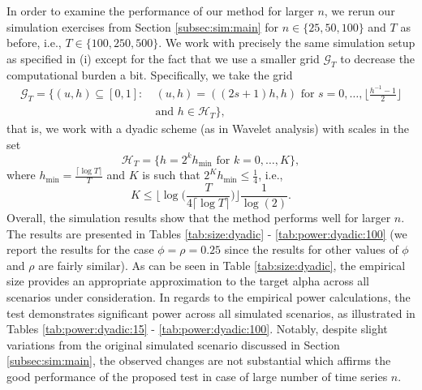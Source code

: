 \documentclass[12pt]{article}
\begin{document}
In order to examine the performance of our method for larger $n$, we rerun our simulation exercises from Section \ref{subsec:sim:main} for $n \in \{25,50,100\}$ and $T$ as before, i.e., $T \in \{100,250,500\}$. We work with precisely the same simulation setup as specified in (i) except for the fact that we use a smaller grid $\mathcal{G}_T$ to decrease the computational burden a bit. Specifically, we take the grid 
\begin{align*}
\mathcal{G}_T = \big\{ (u,h) \subseteq [0,1]: & \ (u,h) = ((2s+1) h, h) \text{ for } s = 0,\ldots,\Big\lfloor \frac{h^ {-1}-1}{2} \Big\rfloor \\ & \ \text{and } h \in \mathcal{H}_T \big\},  
\end{align*}
that is, we work with a dyadic scheme (as in Wavelet analysis) with scales in the set 
\[ \mathcal{H}_T = \big\{ h = 2^k h_{\min} \text{ for } k=0,\ldots,K \big\}, \]  
where $h_{\min} = \frac{\lceil \log T \rceil}{T}$ and $K$ is such that $2^K h_{\min} \le \frac{1}{4}$, i.e.,
\[ K \le \Big\lfloor \log\Big(\frac{T}{4 \lceil \log T \rceil }\Big) \Big\rfloor \frac{1}{\log(2)}. \]
Overall, the simulation results show that the method performs well for larger $n$. The results are presented in Tables \ref{tab:size:dyadic} - \ref{tab:power:dyadic:100} (we report the results for the case $\phi = \rho = 0.25$ since the results for other values of $\phi$ and $\rho$ are fairly similar). As can be seen in Table \ref{tab:size:dyadic}, the empirical size provides an appropriate approximation to the target alpha across all scenarios under consideration. In regards to the empirical power calculations, the test demonstrates significant power across all simulated scenarios, as illustrated in \linebreak Tables \ref{tab:power:dyadic:15} - \ref{tab:power:dyadic:100}. Notably, despite slight variations from the original simulated scenario discussed in Section \ref{subsec:sim:main}, the observed changes are not substantial which affirms the good performance of the proposed test in case of large number of time series $n$.

\end{document}
